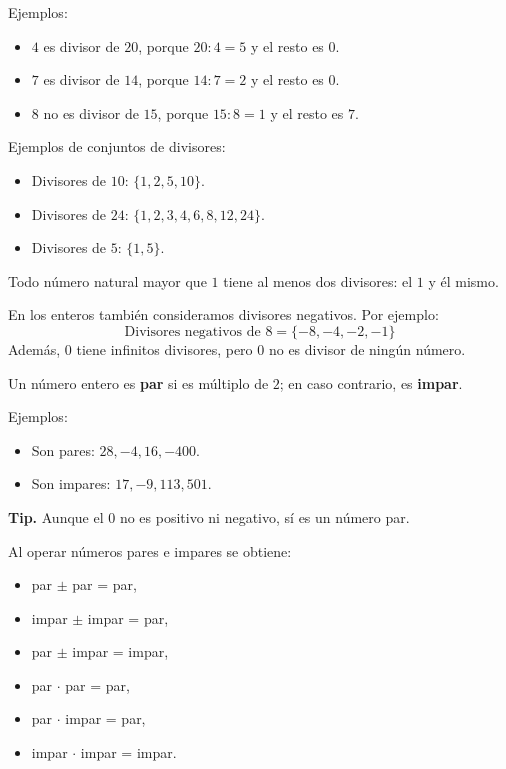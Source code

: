 \documentclass[11pt,letterpaper]{article}
\newcommand{\subtitulo}[1]{\vspace{4pt}\noindent{\large\bfseries\color{zenitnavy} #1}\par\vspace{3pt}}
\begin{document}
Ejemplos:
\begin{itemize}
  \item $4$ es divisor de $20$, porque $20:4=5$ y el resto es $0$.
  \item $7$ es divisor de $14$, porque $14:7=2$ y el resto es $0$.
  \item $8$ no es divisor de $15$, porque $15:8=1$ y el resto es $7$.
\end{itemize}

Ejemplos de conjuntos de divisores:
\begin{itemize}
  \item Divisores de $10$: $\{1,2,5,10\}$.
  \item Divisores de $24$: $\{1,2,3,4,6,8,12,24\}$.
  \item Divisores de $5$: $\{1,5\}$.
\end{itemize}
Todo número natural mayor que $1$ tiene al menos dos divisores: el $1$ y él mismo.

En los enteros también consideramos divisores negativos. Por ejemplo:
\[
\text{Divisores negativos de }8=\{-8,-4,-2,-1\}
\]
Además, $0$ tiene infinitos divisores, pero $0$ no es divisor de ningún número.

\subtitulo{5. Paridad e imparidad}
Un número entero es \textbf{par} si es múltiplo de $2$; en caso contrario, es \textbf{impar}.

Ejemplos:
\begin{itemize}
  \item Son pares: $28,-4,16,-400$.
  \item Son impares: $17,-9,113,501$.
\end{itemize}

\begin{tcolorbox}[tipbox]
\textbf{Tip.} Aunque el $0$ no es positivo ni negativo, sí es un número par.
\end{tcolorbox}

Al operar números pares e impares se obtiene:
\begin{itemize}
  \item par $\pm$ par = par,
  \item impar $\pm$ impar = par,
  \item par $\pm$ impar = impar,
  \item par $\cdot$ par = par,
  \item par $\cdot$ impar = par,
  \item impar $\cdot$ impar = impar.
\end{itemize}
\end{document}
